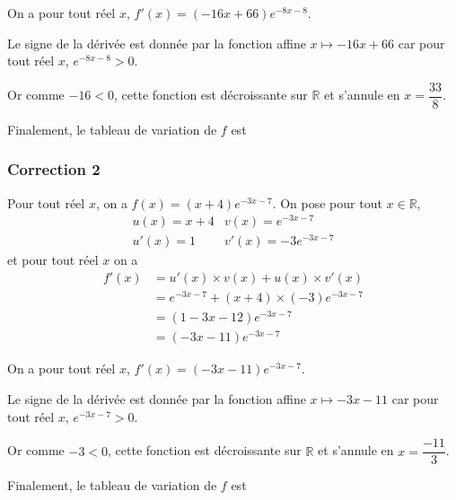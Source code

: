 \documentclass[15pt, mathserif]{beamer}
\begin{document}
\begin{frame}On a pour tout réel $x$, $f'(x) = (-16x+66)e^{-8x-8}$.

Le signe de la dérivée est donnée par la fonction affine $x \mapsto -16x+66$ car pour tout réel $x$, $e^{-8x-8}>0$.

Or comme $-16<0$, cette fonction est décroissante sur $\mathbb{R}$ et s'annule en $x = \dfrac{33}{8}$.

Finalement, le tableau de variation de $f$ est

\hfil{}\end{frame}


\begin{frame}
\vspace{-10mm}
	\frametitle{Correction 2}
Pour tout réel $x$, on a $f(x) =(x+4)e^{-3x-7}$. On pose pour tout $x \in \mathbb{R}$,\[\begin{matrix}u(x) = x+4& v(x) = e^{-3x-7}\\ u'(x) = 1& v'(x) = -3e^{-3x-7}\end{matrix}\]et pour tout réel $x$ on a \begin{align*}f'(x)&= u'(x) \times v(x) + u(x) \times v'(x) \\ &=e^{-3x-7}+(x+4)\times \left(-3\right) e^{-3x-7} \\
	 &= (1-3x-12)e^{-3x-7} \\
	 &= (-3x-11)e^{-3x-7}
\end{align*}

\end{frame}

\begin{frame}On a pour tout réel $x$, $f'(x) = (-3x-11)e^{-3x-7}$.

Le signe de la dérivée est donnée par la fonction affine $x \mapsto -3x-11$ car pour tout réel $x$, $e^{-3x-7}>0$.

Or comme $-3<0$, cette fonction est décroissante sur $\mathbb{R}$ et s'annule en $x = \dfrac{-11}{3}$.

Finalement, le tableau de variation de $f$ est

\hfil{}\end{frame}
\end{document}
